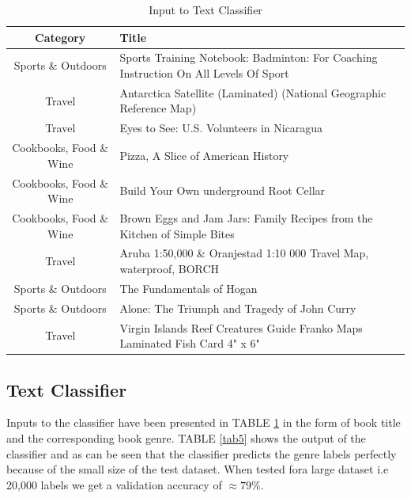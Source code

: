 \documentclass[conference]{IEEEtran}
\begin{document}
\begin{table}[hbtp]
\caption{Input to Text Classifier}
\begin{center}
\begin{tabular}{c|p{5cm}}
\textbf{Category} & \textbf{Title} \\
\hline
Sports \& Outdoors	&	Sports Training Notebook: Badminton: For Coaching Instruction On All Levels Of Sport \\
\hline
Travel			&	Antarctica Satellite (Laminated) (National Geographic Reference Map) \\
\hline
Travel			&	Eyes to See: U.S. Volunteers in Nicaragua \\
\hline
Cookbooks, Food \& Wine	&	Pizza, A Slice of American History \\
\hline
Cookbooks, Food \& Wine	&	Build Your Own underground Root Cellar \\
\hline
Cookbooks, Food \& Wine	&	Brown Eggs and Jam Jars: Family Recipes from the Kitchen of Simple Bites \\
\hline
Travel			&	Aruba 1:50,000 \& Oranjestad 1:10 000 Travel Map, waterproof, BORCH \\
\hline
Sports \& Outdoors	&	The Fundamentals of Hogan \\
\hline
Sports \& Outdoors	&	Alone: The Triumph and Tragedy of John Curry \\
\hline
Travel			&	Virgin Islands Reef Creatures Guide Franko Maps Laminated Fish Card 4" x 6" \\
\end{tabular}
\label{tab4}
\end{center}
\end{table}

\subsection{Text Classifier}
Inputs to the classifier have been presented in TABLE \ref{tab4} in the form of book title and the corresponding book genre. TABLE \ref{tab5} shows the output of the classifier and as can be seen that the classifier predicts the genre labels perfectly because of the small size of the test dataset. When tested fora large dataset i.e 20,000 labels we get a validation accuracy of $\approx 79 \% $.
\end{document}
